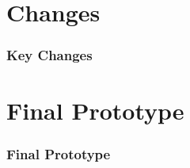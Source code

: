 \documentclass{beamer}
\begin{document}
\section{Changes}
\begin{frame}
	\frametitle{Key Changes}
\end{frame}


\section{Final Prototype}
\begin{frame}
	\frametitle{Final Prototype}
\end{frame}



\end{document}
